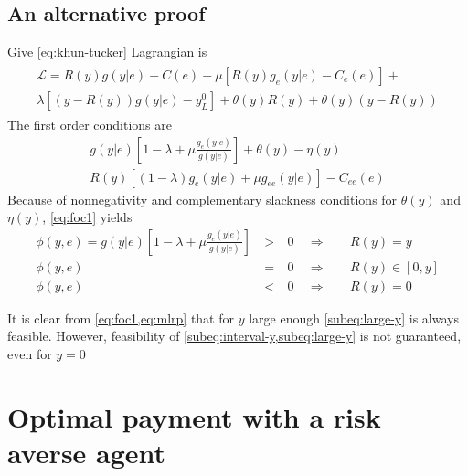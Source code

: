 \subsection{An alternative proof} %
\label{sub:an_alternative_proof}
Give \cref{eq:khun-tucker}  Lagrangian is
\begin{align}
    \begin{split}
        \mathcal{L}=R(y)g(y|e)-C(e)+\mu [R(y)g_e(y|e)-C_e(e)]+ \\ 
        \lambda [(y-R(y))g(y|e)-y_L^0]+\theta(y) R(y)+\theta(y)\left(y-R(y)\right)
    \end{split}
\end{align}
The first order conditions are
\begin{subequations}
\label{eq:foc}
\begin{align}
    g(y|e)\left[1-\lambda+\mu \frac{g_e(y|e)}{g(y|e)}\right]+\theta(y)-\eta(y) \label{eq:foc1} \\
    R(y)\left[(1-\lambda)g_e(y|e)+\mu g_{ee}(y|e)\right]-C_{ee}(e)
\end{align}
\end{subequations}
Because of nonnegativity and complementary slackness conditions for $\theta(y)$ and $\eta(y)$, \cref{eq:foc1} yields
\begin{subequations}
\label{eq:KT-analysis}
\begin{alignat}{3}
\phi(y,e) = g(y|e)\left[1-\lambda+\mu \frac{g_e(y|e)}{g(y|e)}\right]
   & \: > \: & 0 &\enspace \Rightarrow &&\enspace R(y)=y \label{subeq:large-y}\\
 \phi(y,e)   & \: = \: & 0 &\enspace \Rightarrow &&\enspace R(y)\in [0,y] \label{subeq:interval-y} \\
 \phi(y,e)   & \: < \: & 0 &\enspace \Rightarrow &&\enspace R(y) =0 \label{subeq:small-y}
\end{alignat}
\end{subequations}

It is clear from \cref{eq:foc1,eq:mlrp} that for $y$ large enough \cref{subeq:large-y} is always feasible. However, feasibility of \cref{subeq:interval-y,subeq:large-y} is not guaranteed, even for $y=0$



\section{Optimal payment with a risk averse agent} %
\label{sec:optimal_payment_with_a_risk_averse_agent}
\printbibliography%
